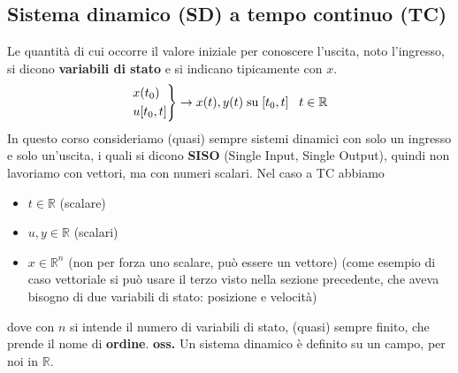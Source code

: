 \subsection{Sistema dinamico (SD) a tempo continuo (TC)}
Le quantità di cui occorre il valore iniziale per conoscere l'uscita, noto l'ingresso, si dicono \textbf{variabili di stato} e si indicano tipicamente con $x$.
\[
    \begin{rcases}
        x(t_0)\\
        u[t_0,t]
    \end{rcases} \rightarrow x(t), y(t) \;\text{su}\; [t_0,t] \;\;\;t \in \mathbb{R}
\]
In questo corso consideriamo (quasi) sempre sistemi dinamici con solo un ingresso e solo un'uscita, i quali si dicono \textbf{SISO} (Single Input, Single Output), quindi non lavoriamo con vettori, ma con numeri scalari.\newline
\newline
Nel caso a TC abbiamo
\begin{itemize}
    \item $t \in \mathbb{R}$ (scalare)
    \item $u,y \in \mathbb{R}$ (scalari)
    \item $x \in \mathbb{R}^n$ (non per forza uno scalare, può essere un vettore) (come esempio di caso vettoriale si può usare il terzo visto nella sezione precedente, che aveva bisogno di due variabili di stato: posizione e velocità)
\end{itemize} 
dove con $n$ si intende il numero di variabili di stato, (quasi) sempre finito, che prende il nome di \textbf{ordine}.\newline
\newline
\textbf{oss.} Un sistema dinamico è definito su un campo, per noi in $\mathbb{R}$.

